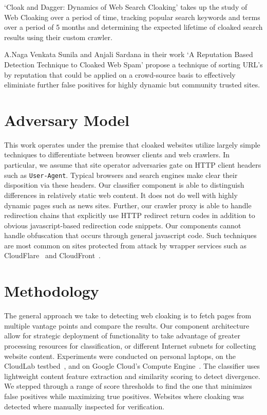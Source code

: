 \documentclass[letterpaper,twocolumn,10pt]{article}
\begin{document}
`Cloak and Dagger: Dynamics of Web Search Cloaking'\cite{Wang:2011:CDD:2046707.2046763} takes up the study of Web Cloaking over a period of time, tracking popular search keywords and terms over a period of 5 months and determining the expected lifetime of cloaked search results using their custom crawler.

A.Naga Venkata Sunila and Anjali Sardana in their work `A Reputation Based Detection Technique to Cloaked Web Spam'\cite{sunil2012reputation} propose a technique of sorting URL's by reputation that could be applied on a crowd-source basis to effectively eliminiate further false positives for highly dynamic but community trusted sites.
\section{Adversary Model}

This work operates under the premise that cloaked websites utilize largely simple techniques to differentiate between browser clients and web crawlers. In particular, we assume that site operator adversaries gate on HTTP client headers such as \texttt{User-Agent}.  Typical browsers and search engines make clear their disposition via these headers.  Our classifier component is able to distinguish differences in relatively static web content.  It does not do well with highly dynamic pages such as news sites.  Further, our crawler proxy is able to handle redirection chains that explicitly use HTTP redirect return codes in addition to obvious javascript-based redirection code snippets.  Our components cannot handle obfuscation that occurs through general javascript code.  Such techniques are most common on sites protected from attack by wrapper services such as CloudFlare~\cite{cloudflare} and CloudFront~\cite{cloudfront}.

\section{Methodology}

The general approach we take to detecting web cloaking is to fetch pages from multiple vantage points and compare the results.  Our component architecture allow for strategic deployment of functionality to take advantage of greater processing resources for classification, or different Internet subnets for collecting website content. Experiments were conducted on personal laptops, on the CloudLab testbed~\cite{cloudlab}, and on Google Cloud's Compute Engine~\cite{gcloud}. The classifier uses lightweight content feature extraction and similarity scoring to detect divergence.  We stepped through a range of score thresholds to find the one that minimizes false positives while maximizing true positives.  Websites where cloaking was detected where manually inspected for verification.
\end{document}

